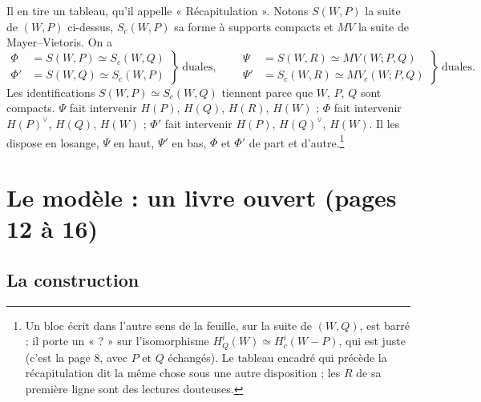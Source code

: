 \documentclass[11pt,a4paper]{article}
\begin{document}
Il en tire un tableau, qu'il appelle « Récapitulation ». Notons $S(W, P)$ la
suite de $(W, P)$ ci-dessus, $S_{c}(W, P)$ sa forme à supports compacts et
$MV$ la suite de Mayer--Vietoris. On a
\[
  \left.\begin{aligned}
    \Phi &= S(W, P) \simeq S_{c}(W, Q) \\
    \Phi' &= S(W, Q) \simeq S_{c}(W, P)
  \end{aligned}\right\}\ \text{duales,}
  \qquad
  \left.\begin{aligned}
    \Psi &= S(W, R) \simeq MV(W; P, Q) \\
    \Psi' &= S_{c}(W, R) \simeq MV_{c}(W; P, Q)
  \end{aligned}\right\}\ \text{duales.}
\]
Les identifications $S(W, P) \simeq S_{c}(W, Q)$ tiennent parce que $W$, $P$,
$Q$ sont compacts. $\Psi$ fait intervenir $H(P)$, $H(Q)$, $H(R)$, $H(W)$ ;
$\Phi$ fait intervenir $H(P)^{\vee}$, $H(Q)$, $H(W)$ ; $\Phi'$ fait intervenir
$H(P)$, $H(Q)^{\vee}$, $H(W)$. Il les dispose en losange,
$\Psi$ en haut, $\Psi'$ en bas, $\Phi$ et $\Phi'$ de part et
d'autre.\footnote{Un bloc écrit dans l'autre sens de la feuille, sur la suite
de $(W, Q)$, est barré ; il porte un « ? » sur l'isomorphisme
$H^{i}_{Q}(W) \simeq H^{i}_{c}(W - P)$, qui est juste (c'est la page 8, avec
$P$ et $Q$ échangés). Le tableau encadré qui précède la récapitulation dit la
même chose sous une autre disposition ; les $R$ de sa première ligne sont des
lectures douteuses.}

\section*{Le modèle : un livre ouvert (pages 12 à 16)}

\subsection*{La construction}
\end{document}
